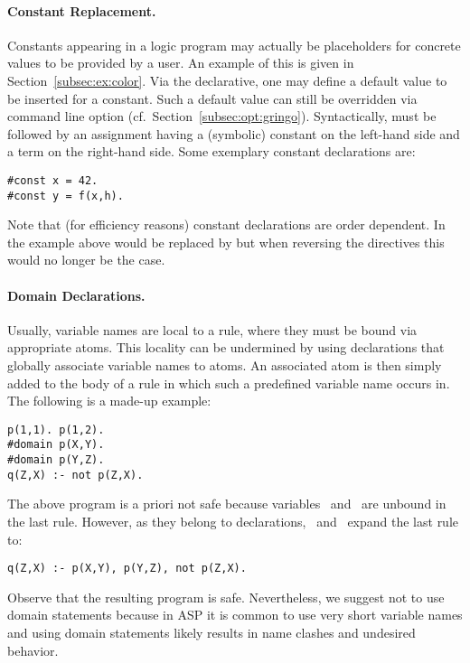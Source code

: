 \paragraph{Constant Replacement.}
%
Constants appearing in a logic program may actually be placeholders for
concrete values to be provided by a user.
An example of this is given in Section~\ref{subsec:ex:color}.
Via the  declarative,
one may define a default value to be inserted for a constant.
Such a default value can still be overridden via command line option
 (cf.\ Section~\ref{subsec:opt:gringo}).
Syntactically,  must be followed by an assignment having
a (symbolic) constant on the left-hand side and a term on the right-hand side.
Some exemplary constant declarations are:
%
\begin{lstlisting}[numbers=none]
#const x = 42.
#const y = f(x,h).
\end{lstlisting}%
Note that (for efficiency reasons) constant declarations are order dependent.
In the example above  would be replaced by 
but when reversing the directives this would no longer be the case.

\paragraph{Domain Declarations.}
%
Usually, variable names are local to a rule,
where they must be bound via appropriate atoms.
This locality can be undermined by using
 declarations 
that globally associate variable names to atoms.
An associated atom is then simply added to the body of a rule in which
such a predefined variable name occurs in.
The following is a made-up example:
%
\begin{lstlisting}[numbers=none]
p(1,1). p(1,2).
#domain p(X,Y).
#domain p(Y,Z).
q(Z,X) :- not p(Z,X).
\end{lstlisting}
%
The above program is a priori not safe because
variables~ and~ are unbound in the last rule.
However, as they belong to  declarations,
\gringo\ and \clingo\ expand the last rule to:
%
\begin{lstlisting}[numbers=none]
q(Z,X) :- p(X,Y), p(Y,Z), not p(Z,X).
\end{lstlisting}
%
Observe that the resulting program is safe.
Nevertheless, we suggest not to use domain statements because 
in ASP it is common to use very short variable names and
using domain statements likely results in name clashes
and undesired behavior.

